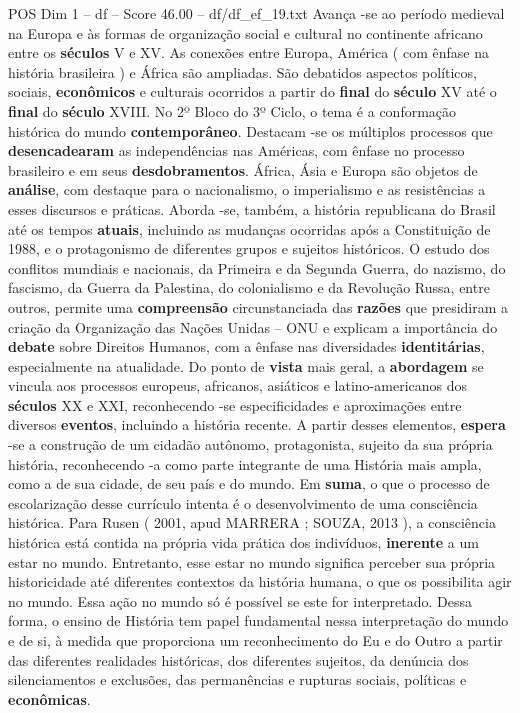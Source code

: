 \begin{textsample}{POS Dim 1 – df – Score 46.00 – df/df\_ef\_19.txt}
Avança -se ao período medieval na Europa e às formas de organização social e cultural no continente africano entre os \textbf{séculos} V e XV.
As conexões entre Europa, América ( com ênfase na história brasileira ) e África são ampliadas.
São debatidos aspectos políticos, sociais, \textbf{econômicos} e culturais ocorridos a partir do \textbf{final} do \textbf{século} XV até o \textbf{final} do \textbf{século} XVIII.
No 2º Bloco do 3º Ciclo, o tema é a conformação histórica do mundo \textbf{contemporâneo}.
Destacam -se os múltiplos processos que \textbf{desencadearam} as independências nas Américas, com ênfase no processo brasileiro e em seus \textbf{desdobramentos}.
África, Ásia e Europa são objetos de \textbf{análise}, com destaque para o nacionalismo, o imperialismo e as resistências a esses discursos e práticas.
Aborda -se, também, a história republicana do Brasil até os tempos \textbf{atuais}, incluindo as mudanças ocorridas após a Constituição de 1988, e o protagonismo de diferentes grupos e sujeitos históricos.
O estudo dos conflitos mundiais e nacionais, da Primeira e da Segunda Guerra, do nazismo, do fascismo, da Guerra da Palestina, do colonialismo e da Revolução Russa, entre outros, permite uma \textbf{compreensão} circunstanciada das \textbf{razões} que presidiram a criação da Organização das Nações Unidas – ONU e explicam a importância do \textbf{debate} sobre Direitos Humanos, com a ênfase nas diversidades \textbf{identitárias}, especialmente na atualidade.
Do ponto de \textbf{vista} mais geral, a \textbf{abordagem} se vincula aos processos europeus, africanos, asiáticos e latino-americanos dos \textbf{séculos} XX e XXI, reconhecendo -se especificidades e aproximações entre diversos \textbf{eventos}, incluindo a história recente.
A partir desses elementos, \textbf{espera} -se a construção de um cidadão autônomo, protagonista, sujeito da sua própria história, reconhecendo -a como parte integrante de uma História mais ampla, como a de sua cidade, de seu país e do mundo.
Em \textbf{suma}, o que o processo de escolarização desse currículo intenta é o desenvolvimento de uma consciência histórica.
Para Rusen ( 2001, apud MARRERA ; SOUZA, 2013 ), a consciência histórica está contida na própria vida prática dos indivíduos, \textbf{inerente} a um estar no mundo.
Entretanto, esse estar no mundo significa perceber sua própria historicidade até diferentes contextos da história humana, o que os possibilita agir no mundo.
Essa ação no mundo só é possível se este for interpretado.
Dessa forma, o ensino de História tem papel fundamental nessa interpretação do mundo e de si, à medida que proporciona um reconhecimento do Eu e do Outro a partir das diferentes realidades históricas, dos diferentes sujeitos, da denúncia dos silenciamentos e exclusões, das permanências e rupturas sociais, políticas e \textbf{econômicas}.


\end{textsample}
